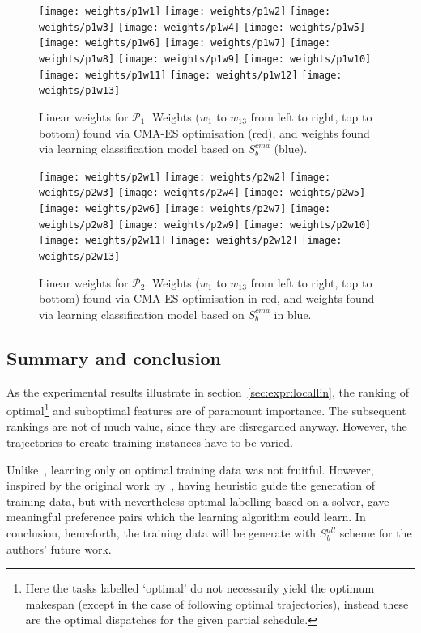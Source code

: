 \documentclass[smallextended]{llncs}
\newcommand{\citep}[1]{\cite{#1}}
\begin{document}
\begin{figure}\centering
\texttt{[image: weights/p1w1]}
 \texttt{[image: weights/p1w2]}
 \texttt{[image: weights/p1w3]}
 \texttt{[image: weights/p1w4]}
 \texttt{[image: weights/p1w5]}
 \texttt{[image: weights/p1w6]}
 \texttt{[image: weights/p1w7]}
 \texttt{[image: weights/p1w8]}
 \texttt{[image: weights/p1w9]}
 \texttt{[image: weights/p1w10]}
 \texttt{[image: weights/p1w11]}
 \texttt{[image: weights/p1w12]}
 \texttt{[image: weights/p1w13]}
\caption{Linear weights for $\mathcal{P}_1$. Weights ($w_1$ to $w_{13}$ from left to right, top to bottom) found via CMA-ES optimisation (red), and weights found via learning classification model based on $S_b^{cma}$ (blue). }\label{fig:weights:p1}
\end{figure}

\begin{figure}\centering
\texttt{[image: weights/p2w1]}
 \texttt{[image: weights/p2w2]}
 \texttt{[image: weights/p2w3]}
 \texttt{[image: weights/p2w4]}
 \texttt{[image: weights/p2w5]}
 \texttt{[image: weights/p2w6]}
 \texttt{[image: weights/p2w7]}
 \texttt{[image: weights/p2w8]}
 \texttt{[image: weights/p2w9]}
 \texttt{[image: weights/p2w10]}
 \texttt{[image: weights/p2w11]}
 \texttt{[image: weights/p2w12]}
 \texttt{[image: weights/p2w13]}
\caption{Linear weights for $\mathcal{P}_2$. Weights  ($w_1$ to $w_{13}$ from left to right, top to bottom) found via CMA-ES optimisation in red, and weights found via learning classification model based on $S_b^{cma}$ in blue.}\label{fig:weights:p2}
\end{figure}

\subsection{Summary and conclusion}
As the experimental results illustrate in section~\ref{sec:expr:locallin}, the ranking of optimal\footnote{Here the 
tasks labelled `optimal' do not necessarily yield the optimum makespan (except in the case of following optimal 
trajectories), instead these are the optimal dispatches for the given partial schedule.} and suboptimal features are 
of paramount importance. The subsequent rankings are not of much value, since they are disregarded anyway. However, 
the trajectories to create training instances have to be varied.

Unlike~\citep{Siggi10,Malik08,Russell09}, learning only on optimal training data was not fruitful. However, inspired 
by the original work by~\cite{Siggi05}, having heuristic guide the generation of training data, but with nevertheless 
optimal labelling based on a solver, gave meaningful preference pairs which the learning algorithm could learn. In 
conclusion, henceforth, the training data will be generate with $S_{b}^{all}$ scheme for the authors' future work.
\end{document}
